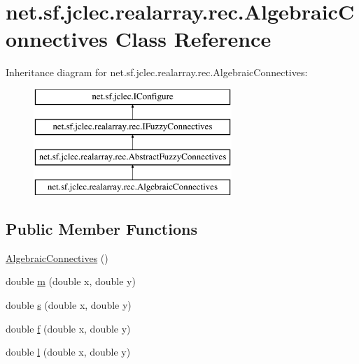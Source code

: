 \hypertarget{classnet_1_1sf_1_1jclec_1_1realarray_1_1rec_1_1_algebraic_connectives}{\section{net.\-sf.\-jclec.\-realarray.\-rec.\-Algebraic\-Connectives Class Reference}
\label{classnet_1_1sf_1_1jclec_1_1realarray_1_1rec_1_1_algebraic_connectives}
}
Inheritance diagram for net.\-sf.\-jclec.\-realarray.\-rec.\-Algebraic\-Connectives\-:\begin{figure}[H]
\begin{center}
\leavevmode
\includegraphics[height=4.000000cm]{classnet_1_1sf_1_1jclec_1_1realarray_1_1rec_1_1_algebraic_connectives}
\end{center}
\end{figure}
\subsection*{Public Member Functions}
\begin{DoxyCompactItemize}
\item 
\hyperlink{classnet_1_1sf_1_1jclec_1_1realarray_1_1rec_1_1_algebraic_connectives_a26350ab501c2c71341af01ed4f3fe77f}{Algebraic\-Connectives} ()
\item 
double \hyperlink{classnet_1_1sf_1_1jclec_1_1realarray_1_1rec_1_1_algebraic_connectives_a218066c3869342ae5099c6791cff33a6}{m} (double x, double y)
\item 
double \hyperlink{classnet_1_1sf_1_1jclec_1_1realarray_1_1rec_1_1_algebraic_connectives_ad95901413e7d84a800693a10ef3f7ac6}{s} (double x, double y)
\item 
double \hyperlink{classnet_1_1sf_1_1jclec_1_1realarray_1_1rec_1_1_algebraic_connectives_a4d773e09a9edc3d2311b8c466fa2433f}{f} (double x, double y)
\item 
double \hyperlink{classnet_1_1sf_1_1jclec_1_1realarray_1_1rec_1_1_algebraic_connectives_a3055caa9ec556a01abbd07d56353addc}{l} (double x, double y)
\end{DoxyCompactItemize}


